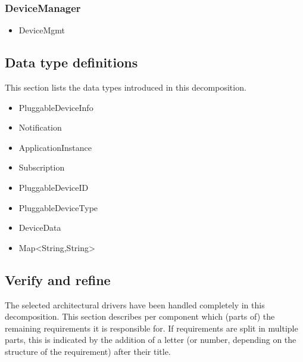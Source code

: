     \subsubsection{DeviceManager}
        \begin{itemize}
        	\item DeviceMgmt
        \end{itemize}


\subsection{Data type definitions}
    This section lists the data types introduced in this decomposition.

    \begin{itemize}
        \item{PluggableDeviceInfo}
        \item{Notification}
        \item{ApplicationInstance}
        \item{Subscription}
        \item{PluggableDeviceID}
        \item{PluggableDeviceType}
        \item{DeviceData}
        \item{Map<String,String>}
    \end{itemize}

\subsection{Verify and refine}
    The selected architectural drivers have been handled completely
    in this decomposition.
    This section describes per component which (parts of) the remaining
    requirements it is responsible for. If requirements are split in
    multiple parts, this is indicated by the addition of a letter
    (or number, depending on the structure of the requirement) after their title.

